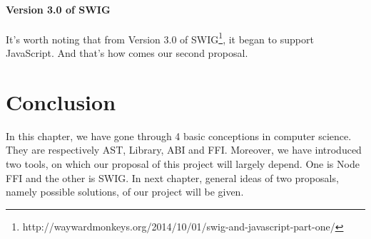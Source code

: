     \paragraph{Version 3.0 of SWIG}
    It's worth noting that from Version 3.0 of SWIG\footnote{http://waywardmonkeys.org/2014/10/01/swig-and-javascript-part-one/}, it began to support JavaScript. And that's how comes our second proposal. 

  



\section{Conclusion}
In this chapter, we have gone through 4 basic conceptions in computer science. They are respectively AST, Library, ABI and FFI. Moreover, we have introduced two tools, on which our proposal of this project will largely depend. One is Node FFI and the other is SWIG. In next chapter, general ideas of two proposals, namely possible solutions, of our project will be given.  
  

